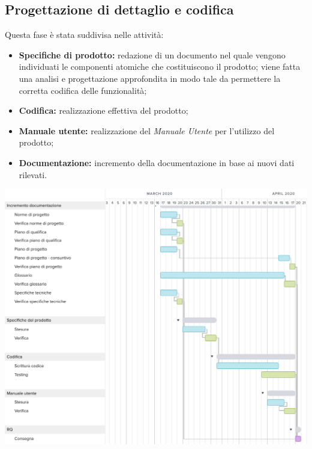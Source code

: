\subsection{Progettazione di dettaglio e codifica}
Questa fase è stata suddivisa nelle attività:
\begin{itemize}
	\item \textbf{Specifiche di prodotto:} redazione di un documento nel quale vengono individuati le componenti atomiche che costituiscono il prodotto; viene fatta una analisi e progettazione approfondita in modo tale da permettere la corretta codifica delle funzionalità;
	\item  \textbf{Codifica:} realizzazione effettiva del prodotto;
	\item \textbf{Manuale utente:} realizzazione del \textit{Manuale Utente} per l'utilizzo del prodotto;
	\item \textbf{Documentazione:} incremento della documentazione in base ai nuovi dati rilevati.
\end{itemize}
\includegraphics[width=\textwidth]{res/img/g4}
